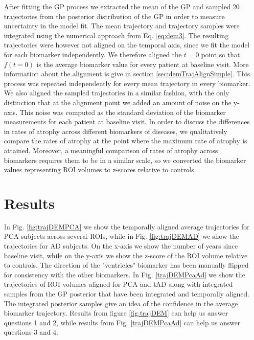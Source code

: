 After fitting the GP process we extracted the mean of the GP and sampled 20 trajectories from the posterior distribution of the GP in order to measure uncertainty in the model fit. The mean trajectory and trajectory samples were integrated using the numerical approach from Eq. \ref{eq:dem3}. The resulting trajectories were however not aligned on the temporal axis, since we fit the model for each biomarker independently. We therefore aligned the $t=0$ point so that $f(t=0)$ is the average biomarker value for every patient at baseline visit. More information about the alignment is give in section \ref{sec:demTrajAlignSimple}. This process was repeated independently for every mean trajectory in every biomarker. We also aligned the sampled trajectories in a similar fashion, with the only distinction that at the alignment point we added an amount of noise on the y-axis. This noise was computed as the standard deviation of the biomarker measurements for each patient at baseline visit. In order to discuss the differences in rates of atrophy across different biomarkers of diseases, we qualitatively compare the rates of atrophy at the point where the maximum rate of atrophy is attained. Moreover, a meaningful comparison of rates of atrophy across biomarkers requires them to be in a similar scale, so we converted the biomarker values representing ROI volumes to z-scores relative to controls. 

\section{Results}
\label{sec:demResults}

In Fig. \ref{fig:trajDEMPCA} we show the temporally aligned average trajectories for PCA subjects across several ROIs, while in Fig. \ref{fig:trajDEMAD} we show the trajectories for AD subjects. On the x-axis we show the number of years since baseline visit, while on the y-axis we show the z-score of the ROI volume relative to controls. The direction of the "ventricles" biomarker has been manually flipped for consistency with the other biomarkers. In Fig. \ref{trajDEMPcaAd} we show the trajectories of ROI volumes aligned for PCA and tAD along with integrated samples from the GP posterior that have been integrated and temporally aligned. The integrated posterior samples give an idea of the confidence in the average biomarker trajectory. Results from figure \ref{fig:trajDEM} can help us answer questions 1 and 2, while results from Fig. \ref{trajDEMPcaAd} can help us answer questions 3 and 4. 

